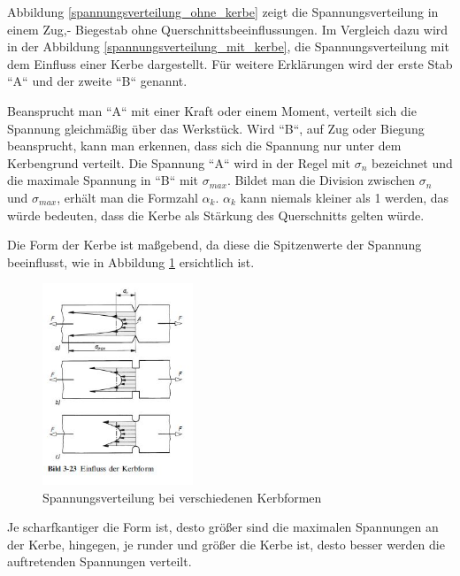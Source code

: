 	Abbildung \ref{spannungsverteilung_ohne_kerbe} zeigt die Spannungsverteilung in einem Zug,- \bzw Biegestab ohne Querschnittsbeeinflussungen.
	Im Vergleich dazu wird in der Abbildung \ref{spannungsverteilung_mit_kerbe}, die Spannungsverteilung mit dem Einfluss einer Kerbe dargestellt.
	Für weitere Erklärungen wird der erste Stab “A“ und der zweite “B“ genannt.

	Beansprucht man “A“ mit einer Kraft oder einem Moment, verteilt sich die Spannung gleichmäßig über das Werkstück.
	Wird “B“, auf Zug oder Biegung beansprucht, kann man erkennen, dass sich die Spannung nur unter dem Kerbengrund verteilt.
	Die Spannung “A“ wird in der Regel mit $\sigma_{n}$ bezeichnet und die maximale Spannung in “B“ mit $\sigma_{max}$.
	Bildet man die Division zwischen $\sigma_{n}$ und $\sigma_{max}$, erhält man die Formzahl $\alpha_{k}$.
	$\alpha_{k}$ kann niemals kleiner als 1 werden, das würde bedeuten, dass die Kerbe als Stärkung des Querschnitts gelten würde.

	Die Form der Kerbe ist maßgebend, da diese die Spitzenwerte der Spannung beeinflusst, wie in Abbildung \ref{kerbform} ersichtlich ist.

			\begin{figure}[H]
			\begin{centering}
			\includegraphics[width = 0.4\textwidth]{Bilder/kerbform}
			\par\end{centering}
			\caption[Spannungsverteilung bei verschiedenen Kerbformen]{Spannungsverteilung bei verschiedenen Kerbformen\cite{kerbformen}}
			\label{kerbform}
			\end{figure}

	Je scharfkantiger die Form ist, desto größer sind die maximalen Spannungen an der Kerbe, hingegen, je runder und größer die Kerbe ist, desto besser werden die auftretenden Spannungen verteilt.

